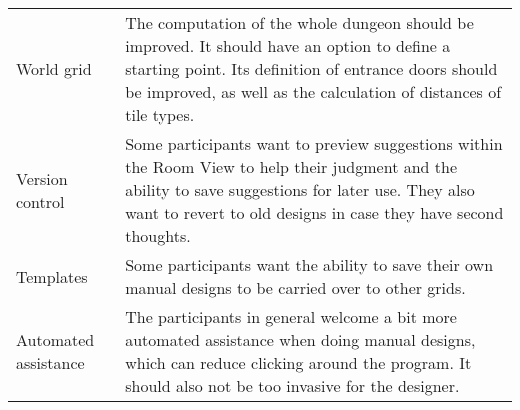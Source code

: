 \begin{table}[ht]
{\begin{tabularx}{\textwidth}{|p{}|p{}|}
World grid                                       & The computation of the whole dungeon should be improved. It should have an option to define a starting point. Its definition of entrance doors should be improved, as well as the calculation of distances of tile types.                                                                                                                                                                       \\\cline{1-2}
Version control & Some participants want to preview suggestions within the Room View to help their judgment and the ability to save suggestions for later use. They also want to revert to old designs in case they have second thoughts.                                                                                                     \\\cline{1-2}
Templates                             & Some participants want the ability to save their own manual designs to be carried over to other grids.                                                                                                                                                                                                                                     \\\cline{1-2}
Automated assistance                                  & The participants in general welcome a bit more automated assistance when doing manual designs, which can reduce clicking around the program. It should also not be too invasive for the designer. 
	\\ \cline{1-2}
\end{tabularx}
}
\end{table}

